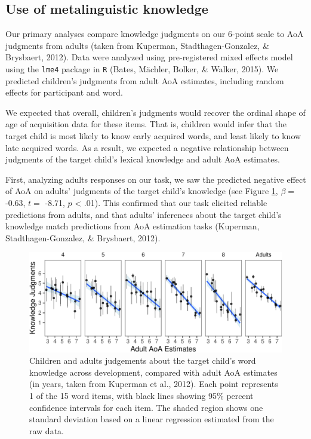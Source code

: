 \documentclass[10pt, letterpaper]{article}
\newenvironment{CodeChunk}{}{}
\begin{document}
\hypertarget{use-of-metalinguistic-knowledge}{%
\subsection{Use of metalinguistic
knowledge}\label{use-of-metalinguistic-knowledge}}

Our primary analyses compare knowledge judgments on our 6-point scale to
AoA judgments from adults (taken from Kuperman, Stadthagen-Gonzalez, \&
Brysbaert, 2012). Data were analyzed using pre-registered mixed effects
model using the \texttt{lme4} package in \texttt{R} (Bates, Mächler,
Bolker, \& Walker, 2015). We predicted children's judgments from adult
AoA estimates, including random effects for participant and word.

We expected that overall, children's judgments would recover the ordinal
shape of age of acquisition data for these items. That is, children
would infer that the target child is most likely to know early acquired
words, and least likely to know late acquired words. As a result, we
expected a negative relationship between judgments of the target child's
lexical knowledge and adult AoA estimates.

First, analyzing adults responses on our task, we saw the predicted
negative effect of AoA on adults' judgments of the target child's
knowledge (see Figure \ref{fig:development}, \(\beta =\) -0.63, \(t =\)
-8.71, \(p\) \textless{} .01). This confirmed that our task elicited
reliable predictions from adults, and that adults' inferences about the
target child's knowledge match predictions from AoA estimation tasks
(Kuperman, Stadthagen-Gonzalez, \& Brysbaert, 2012).

\begin{CodeChunk}
\begin{figure}[tb]
\includegraphics{figs/development-1} \caption[Children and adults judgements about the target child's word knowledge across development, compared with adult AoA estimates (in years, taken from Kuperman et al., 2012)]{Children and adults judgements about the target child's word knowledge across development, compared with adult AoA estimates (in years, taken from Kuperman et al., 2012). Each point represents 1 of the 15 word items, with black lines showing 95\% percent confidence intervals for each item. The shaded region shows one standard deviation based on a linear regression estimated from the raw data.}\label{fig:development}
\end{figure}
\end{CodeChunk}
\end{document}
